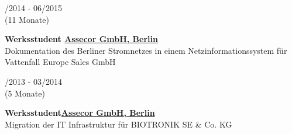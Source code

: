 \documentclass{article}
\newcommand{\spacingWork}{0.25cm}
\newcommand{\minipageSmall}{0.19}
\newcommand{\minipageBig}{0.78}
\begin{document}
\begin{minipage}[t]{0.70\textwidth}
	\vspace{\spacingWork}
	


	\vspace{\spacingWork}

	\begin{minipage}[t]{\minipageSmall\textwidth}
		/2014 - 06/2015\\(11 Monate)
	\end{minipage}
	\hfill
	\begin{minipage}[t]{\minipageBig\textwidth}
		\textbf{Werksstudent\hfill
		\href{https://assecor.de/}{\color{pblue}Assecor GmbH, Berlin}}\\
		Dokumentation des Berliner Stromnetzes in einem Netzinformationssystem für Vattenfall Europe Sales GmbH
	\end{minipage}

	\vspace{\spacingWork}

	\begin{minipage}[t]{\minipageSmall\textwidth}
		/2013 - 03/2014 \\(5 Monate)
	\end{minipage}
	\hfill
	\begin{minipage}[t]{\minipageBig\textwidth}
		\textbf{Werksstudent\hfill \href{https://assecor.de/}{\color{pblue}Assecor GmbH, Berlin}}\\
		Migration der IT Infrastruktur für BIOTRONIK SE \& Co. KG
	\end{minipage}


\end{minipage}
\end{document}
